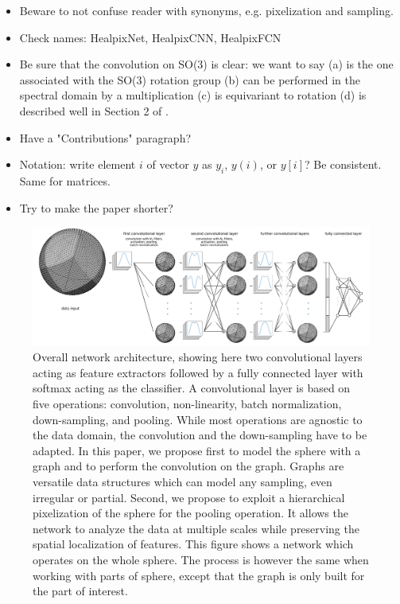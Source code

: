 \documentclass[final,twocolumn,3p,times,authoryear]{elsarticle}
\newcommand{\nati}[1]{{\color[rgb]{.1,.6,.1}{#1}}}
\newcommand{\TK}[1]{{\color{red}{TK:#1}}}
\newcommand{\1}{\b{1}}              %
\newcommand{\0}{\b{0}}              %
\begin{document}
\begin{itemize}[noitemsep,topsep=0pt,parsep=0pt,partopsep=0pt]
	\item Beware to not confuse reader with synonyms, e.g. pixelization and sampling.
    \item Check names: HealpixNet, HealpixCNN, HealpixFCN
    \item Be sure that the convolution on SO(3) is clear: we want to say (a) is the one associated with the SO(3) rotation group (b) can be performed  in the spectral domain by a multiplication (c) is equivariant to rotation (d) is described well in Section 2 of \citep{kondor2018clebsch}.
	\item Have a "Contributions" paragraph?
	\item Notation: write element $i$ of vector $y$ as $y_i$, $y(i)$, or $y[i]$? Be consistent. Same for matrices.
	\item Try to make the paper shorter?
\end{itemize}

\begin{figure}
	\centering
	\includegraphics[width=\linewidth]{figure_architecture_v3.pdf}
	\caption{Overall network architecture, showing here two convolutional layers acting as feature extractors followed by a fully connected layer with softmax acting as the classifier.
    A convolutional layer is based on five operations: convolution, non-linearity, batch normalization, down-sampling, and pooling. While most operations are agnostic to the data domain, the convolution and the down-sampling have to be adapted. In this paper, we propose first to model the sphere with a graph and to perform the convolution on the graph. Graphs are versatile data structures which can model any sampling, even irregular or partial. Second, we propose to exploit a hierarchical pixelization of the sphere for the pooling operation. It allows the network to analyze the data at multiple scales while preserving the spatial localization of features. This figure shows a network which operates on the whole sphere. The process is however the same when working with parts of sphere, except that the graph is only built for the part of interest.}
	\label{fig:architecture}
\end{figure}
\end{document}
